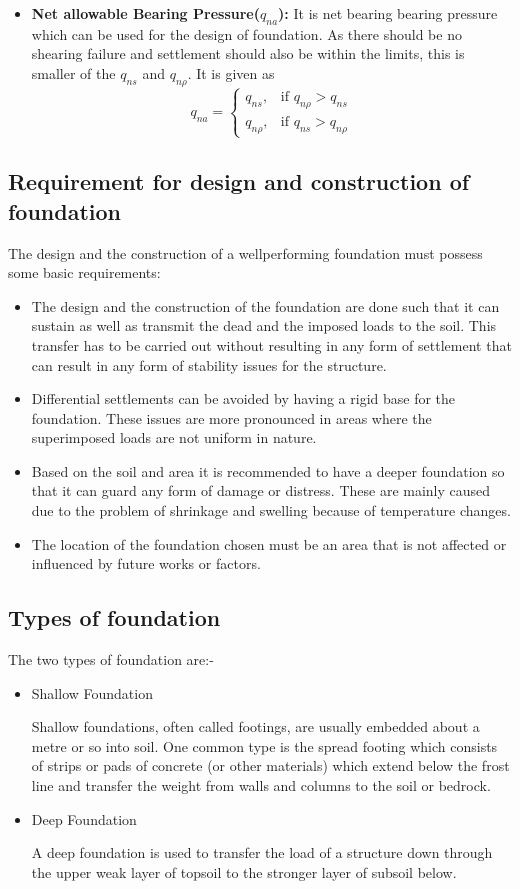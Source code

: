 \begin{itemize}
\item \textbf{Net allowable Bearing Pressure($q_{na}$):} It is net bearing bearing pressure which can be used for the design of foundation. As there should be no shearing failure and settlement should also be within the limits, this is smaller of the $q_{ns}$ and $q_{n\rho}$. It is given as
\begin{equation}
q_{na} = \begin{cases}
    q_{ns}, & \text{if } q_{n\rho} > q_{ns}\\
	q_{n\rho}, & \text{if } q_{ns} > q_{n\rho}
	\end{cases}
\end{equation}
\end{itemize}

\subsection{Requirement for design and construction of foundation}
The design and the construction of a well\-performing foundation must possess some basic requirements: 
\begin{itemize}
	\item 	The design and the construction of the foundation are done such that it can sustain as well as transmit the dead and the imposed loads to the soil. This transfer has to be carried out without resulting in any form of settlement that can result in any form of stability issues for the structure.
	\item Differential settlements can be avoided by having a rigid base for the foundation. These issues are more pronounced in areas where the superimposed loads are not uniform in nature.
	\item Based on the soil and area it is recommended to have a deeper foundation so that it can guard any form of damage or distress. These are mainly caused due to the problem of shrinkage and swelling because of temperature changes.
	\item The location of the foundation chosen must be an area that is not affected or influenced by future works or factors.
\end{itemize}

\subsection{Types of foundation}
The two types of foundation are:-
\begin{itemize}
  \item Shallow Foundation
  \par
  Shallow foundations, often called footings, are usually embedded about a metre or so into soil. One common type is the spread footing which consists of strips or pads of concrete (or other materials) which extend below the frost line and transfer the weight from walls and columns to the soil or bedrock.
  \item Deep Foundation
  \par
  A deep foundation is used to transfer the load of a structure down through the upper weak layer of topsoil to the stronger layer of subsoil below.
\end{itemize}

